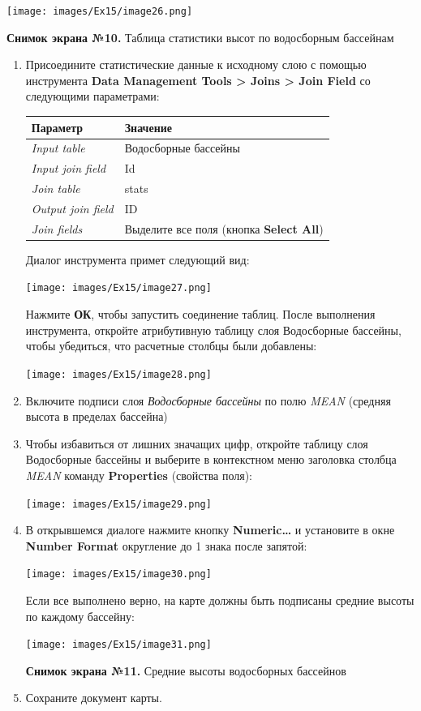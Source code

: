 \documentclass[12pt,]{book}
\begin{document}
\texttt{[image: images/Ex15/image26.png]}

\textbf{Снимок экрана №10.} Таблица статистики высот по водосборным бассейнам

\begin{enumerate}
\def\labelenumi{\arabic{enumi}.}
\item
  Присоедините статистические данные к исходному слою с помощью инструмента \textbf{Data Management Tools \textgreater{} Joins \textgreater{} Join Field} со следующими параметрами:

  \begin{longtable}[]{@{}ll@{}}
  \toprule
  Параметр & Значение\tabularnewline
  \midrule
  \endhead
  \emph{Input table} & Водосборные бассейны\tabularnewline
  \emph{Input join field} & Id\tabularnewline
  \emph{Join table} & stats\tabularnewline
  \emph{Output join field} & ID\tabularnewline
  \emph{Join fields} & Выделите все поля (кнопка \textbf{Select All})\tabularnewline
  \bottomrule
  \end{longtable}

  Диалог инструмента примет следующий вид:

  \texttt{[image: images/Ex15/image27.png]}

  Нажмите \textbf{ОК}, чтобы запустить соединение таблиц. После выполнения инструмента, откройте атрибутивную таблицу слоя Водосборные бассейны, чтобы убедиться, что расчетные столбцы были добавлены:

  \texttt{[image: images/Ex15/image28.png]}
\item
  Включите подписи слоя \emph{Водосборные бассейны} по полю \emph{MEAN} (средняя высота в пределах бассейна)
\item
  Чтобы избавиться от лишних значащих цифр, откройте таблицу слоя Водосборные бассейны и выберите в контекстном меню заголовка столбца \emph{MEAN} команду \textbf{Properties} (свойства поля):

  \texttt{[image: images/Ex15/image29.png]}
\item
  В открывшемся диалоге нажмите кнопку \textbf{Numeric\ldots{}} и установите в окне \textbf{Number Format} округление до 1 знака после запятой:

  \texttt{[image: images/Ex15/image30.png]}

  Если все выполнено верно, на карте должны быть подписаны средние высоты по каждому бассейну:

  \texttt{[image: images/Ex15/image31.png]}

  \textbf{Снимок экрана №11.} Средние высоты водосборных бассейнов
\item
  Сохраните документ карты.
\end{enumerate}
\end{document}
